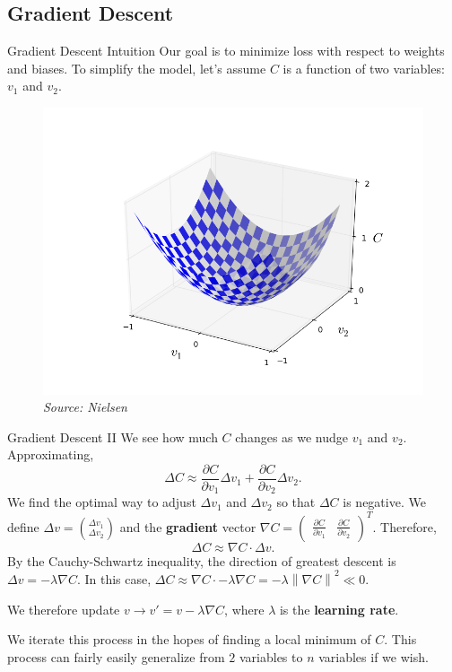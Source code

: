 \documentclass[xcolor=dvipsnames, fontsize=11pt, %
pagesize, %
parskip=half-, t]{beamer}
\newcommand{\norm}[1]{\left\lVert#1\right\rVert}
\begin{document}
 \subsection{Gradient Descent}
 \begin{frame}{Gradient Descent Intuition}
Our goal is to minimize loss with respect to weights and biases. To simplify the model, let's assume $C$ is a function of two variables: $v_1$ and $v_2$. 
\begin{figure}
\includegraphics[scale=0.36]{valley.png}
\caption{\textit{Source: Nielsen}}
\end{figure}
 \end{frame}
 \begin{frame}{Gradient Descent II}
 We see how much $C$ changes as we nudge $v_1$ and $v_2$. Approximating, $$\Delta C\approx \frac{\partial C}{\partial v_1}\Delta v_1+\frac{\partial C}{\partial v_2}\Delta v_2.$$  We  find the optimal way to adjust $\Delta v_1$ and $\Delta v_2$ so that $\Delta C$ is negative. We define $\Delta v=\binom{\Delta v_1}{\Delta v_2}$ and the \textbf{gradient} vector $\nabla C=\begin{pmatrix} \frac{\partial C}{\partial v_1} & \frac{\partial C}{\partial v_2} \end{pmatrix}^{T}.$ 
 Therefore, $$\Delta C\approx \nabla C\cdot \Delta v.$$  By the Cauchy-Schwartz inequality, the direction of greatest descent is $\Delta v=-\lambda \nabla C$. In this case, $\Delta C\approx \nabla C\cdot -\lambda \nabla C=-\lambda \norm{\nabla C}^2\ll 0$.  
 
 \vspace{0.04\textheight}
 We therefore update $v\to v'=v-\lambda \nabla C$, where $\lambda$ is the \textbf{learning rate}. 
 
We iterate this process in the hopes of finding a local minimum of $C$. This process can fairly easily generalize from $2$ variables to $n$ variables if we wish. 
 \end{frame}
\end{document}
